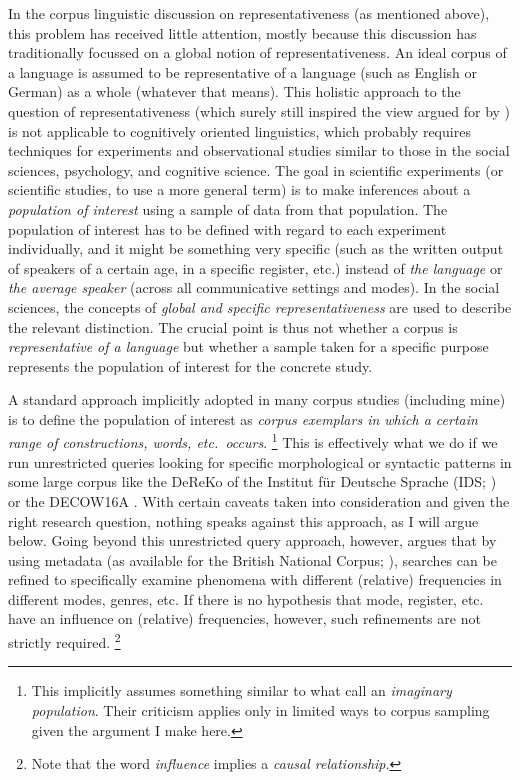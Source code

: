 In the corpus linguistic discussion on representativeness (as mentioned above), this problem has received little attention, mostly because this discussion has traditionally focussed on a global notion of representativeness.
An ideal corpus of a language is assumed to be representative of a language (such as English or German) as a whole (whatever that means).
This holistic approach to the question of representativeness (which surely still inspired the view argued for by \citealt{StefanowitschFlach2016}) is not applicable to cognitively oriented linguistics, which probably requires techniques for experiments and observational studies similar to those in the social sciences, psychology, and cognitive science.
The goal in scientific experiments (or scientific studies, to use a more general term) is to make inferences about a \textit{population of interest} using a sample of data from that population.
The population of interest has to be defined with regard to each experiment individually, and it might be something very specific (such as the written output of speakers of a certain age, in a specific register, etc.) instead of \textit{the language} or \textit{the average speaker} (across all communicative settings and modes).
In the social sciences, the concepts of \textit{global and specific representativeness} \citep[86]{Bortz2005} are used to describe the relevant distinction.
The crucial point is thus not whether a corpus is \textit{representative of a language} but whether a sample taken for a specific purpose represents the population of interest for the concrete study.

A standard approach implicitly adopted in many corpus studies (including mine) is to define the population of interest as \textit{corpus exemplars in which a certain range of constructions, words, etc.\ occurs}.%
\footnote{This implicitly assumes something similar to what \citet[27]{BerkFreedman2009} call an \textit{imaginary population}.
Their criticism applies only in limited ways to corpus sampling given the argument I make here.}
This is effectively what we do if we run unrestricted queries looking for specific morphological or syntactic patterns in some large corpus like the DeReKo of the Institut für Deutsche Sprache (IDS; \citealt{KupietzEa2010}) or the DECOW16A \citep{SchaeferBildhauer2012,BiemannEa2013,SchaeferBildhauer2013,Schaefer2015b}.
With certain caveats taken into consideration and given the right research question, nothing speaks against this approach, as I will argue below.
Going beyond this unrestricted query approach, however, \citet{Gries2015,Gries2017b} argues that by using metadata (as available for the British National Corpus; \citealt{Lee2001,Burnard2007}), searches can be refined to specifically examine phenomena with different (relative) frequencies in different modes, genres, etc.
If there is no hypothesis that mode, register, etc. have an influence on (relative) frequencies, however, such refinements are not strictly required.%
\footnote{Note that the word \textit{influence} implies a \textit{causal relationship}.}

